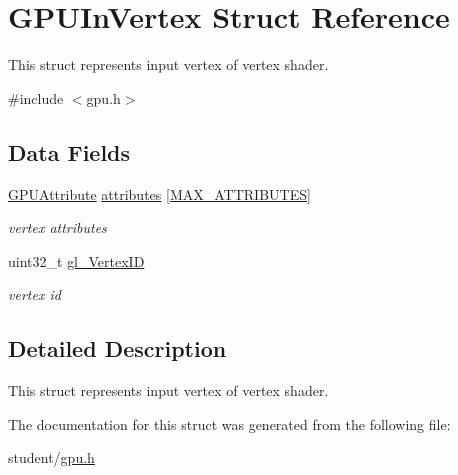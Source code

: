 \hypertarget{structGPUInVertex}{}\section{G\+P\+U\+In\+Vertex Struct Reference}
\label{structGPUInVertex}


This struct represents input vertex of vertex shader.  




{\ttfamily \#include $<$gpu.\+h$>$}

\subsection*{Data Fields}
\begin{DoxyCompactItemize}
\item 
\mbox{\label{structGPUInVertex_a12771bb6471e6c221e91b1804d07ef21}} 
\hyperlink{structGPUAttribute}{G\+P\+U\+Attribute} \hyperlink{structGPUInVertex_a12771bb6471e6c221e91b1804d07ef21}{attributes} \mbox{[}\hyperlink{student_2fwd_8h_a4d992a1f9192388588184753115f6c03}{M\+A\+X\+\_\+\+A\+T\+T\+R\+I\+B\+U\+T\+ES}\mbox{]}
\begin{DoxyCompactList}\small\item\em vertex attributes \end{DoxyCompactList}\item 
\mbox{\label{structGPUInVertex_a0c62cf4df4535a7ff6ca95cc18c422e5}} 
uint32\+\_\+t \hyperlink{structGPUInVertex_a0c62cf4df4535a7ff6ca95cc18c422e5}{gl\+\_\+\+Vertex\+ID}
\begin{DoxyCompactList}\small\item\em vertex id \end{DoxyCompactList}\end{DoxyCompactItemize}


\subsection{Detailed Description}
This struct represents input vertex of vertex shader. 

The documentation for this struct was generated from the following file\+:\begin{DoxyCompactItemize}
\item 
student/\hyperlink{gpu_8h}{gpu.\+h}\end{DoxyCompactItemize}
